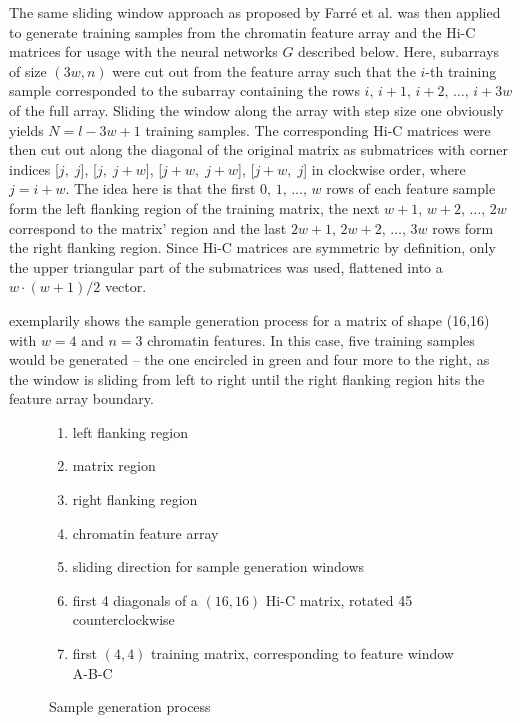 The same sliding window approach as proposed by Farr\'e et al. \cite{Farre2018a} was then applied to generate training samples 
from the chromatin feature array and the Hi-C matrices for usage with the neural networks $G$ described below.
Here, subarrays of size $(3w, n)$ were cut out from the feature array 
such that the $i$-th training sample corresponded to the subarray containing the rows $i,\,i+1,\,i+2,\,\dots,\,i+3w$ of the full array. 
Sliding the window along the array with step size one obviously yields $N=l-3w+1$ training samples.
The corresponding Hi-C matrices were then cut out along the diagonal of the original matrix 
as submatrices with corner indices [$j,\;j$], [$j,\;j+w$], [$j+w,\;j+w$], [$j+w,\;j$] in clockwise order, where $j=i+w$.
The idea here is that the first $0,\,1,\,\dots, \,w$ rows of each feature sample form the left flanking region of the training matrix, 
the next $w+1,\,w+2,\,\dots, \,2w$ correspond to the matrix' region and the last $2w+1,\,2w+2,\,\dots, \,3w$ rows form the right flanking region.
Since Hi-C matrices are symmetric by definition, only the upper triangular part of the submatrices was used, 
flattened into a $w\cdot (w+1)/2$ vector.

 exemplarily shows the sample generation process for a matrix of shape (16,16) with $w=4$ and $n=3$ chromatin features.
In this case, five training samples would be generated -- the one encircled in green and four more to the right, as the window is sliding from left to right until the
right flanking region hits the feature array boundary.
\begin{figure}[hbp]
 \begin{minipage}{0.65\textwidth}
    \caption{Sample generation process}
    \label{fig:methods:sample_gen}
 \end{minipage}\hfill
 \begin{minipage}{0.3\textwidth}
 \scriptsize
  \begin{enumerate}[label=\Alph*:,leftmargin=*]
   \raggedright
    \item left flanking region
    \item matrix region
    \item right flanking region
    \item chromatin feature array
    \item sliding direction for sample generation windows
    \item first 4 diagonals of a $(16, 16)$ Hi-C matrix, rotated \SI{45}{\deg} counterclockwise
    \item first $(4, 4)$ training matrix, corresponding to feature window A-B-C
\end{enumerate}
 \end{minipage}
\end{figure}

